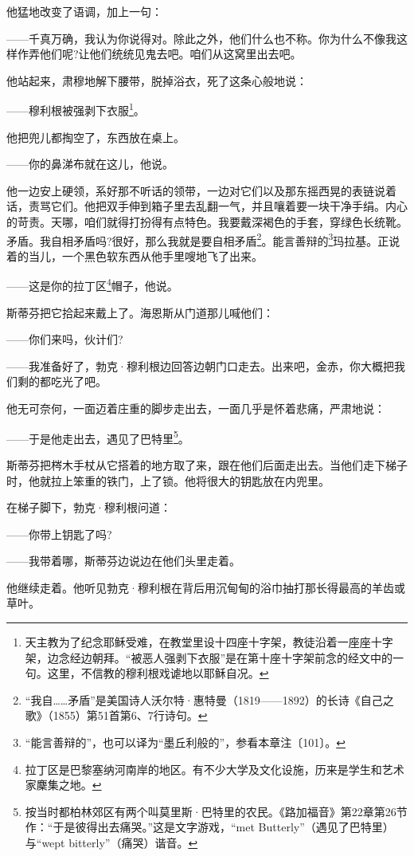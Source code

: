 \par 他猛地改变了语调，加上一句：
\par ——千真万确，我认为你说得对。除此之外，他们什么也不称。你为什么不像我这样作弄他们呢?让他们统统见鬼去吧。咱们从这窝里出去吧。
\par 他站起来，肃穆地解下腰带，脱掉浴衣，死了这条心般地说：
\par ——穆利根被强剥下衣服\footnote{天主教为了纪念耶稣受难，在教堂里设十四座十字架，教徒沿着一座座十字架，边念经边朝拜。“被恶人强剥下衣服”是在第十座十字架前念的经文中的一句。这里，不信教的穆利根戏谑地以耶稣自况。}。
\par 他把兜儿都掏空了，东西放在桌上。
\par ——你的鼻涕布就在这儿，他说。
\par 他一边安上硬领，系好那不听话的领带，一边对它们以及那东摇西晃的表链说着话，责骂它们。他把双手伸到箱子里去乱翻一气，并且嚷着要一块干净手绢。内心的苛责。天哪，咱们就得打扮得有点特色。我要戴深褐色的手套，穿绿色长统靴。矛盾。我自相矛盾吗?很好，那么我就是要自相矛盾\footnote{“我自……矛盾”是美国诗人沃尔特·惠特曼（1819——1892）的长诗《自己之歌》（1855）第51首第6、7行诗句。}。能言善辩的\footnote{“能言善辩的”，也可以译为“墨丘利般的”，参看本章注〔101〕。}玛拉基。正说着的当儿，一个黑色软东西从他手里嗖地飞了出来。
\par ——这是你的拉丁区\footnote{拉丁区是巴黎塞纳河南岸的地区。有不少大学及文化设施，历来是学生和艺术家麇集之地。}帽子，他说。
\par 斯蒂芬把它拾起来戴上了。海恩斯从门道那儿喊他们：
\par ——你们来吗，伙计们?
\par ——我准备好了，勃克·穆利根边回答边朝门口走去。出来吧，金赤，你大概把我们剩的都吃光了吧。
\par 他无可奈何，一面迈着庄重的脚步走出去，一面几乎是怀着悲痛，严肃地说：
\par ——于是他走出去，遇见了巴特里\footnote{按当时都柏林郊区有两个叫莫里斯·巴特里的农民。《路加福音》第22章第26节作：“于是彼得出去痛哭。”这是文字游戏，“met Butterly”（遇见了巴特里）与“wept bitterly”（痛哭）谐音。}。
\par 斯蒂芬把梣木手杖从它搭着的地方取了来，跟在他们后面走出去。当他们走下梯子时，他就拉上笨重的铁门，上了锁。他将很大的钥匙放在内兜里。
\par 在梯子脚下，勃克·穆利根问道：
\par ——你带上钥匙了吗?
\par ——我带着哪，斯蒂芬边说边在他们头里走着。
\par 他继续走着。他听见勃克·穆利根在背后用沉甸甸的浴巾抽打那长得最高的羊齿或草叶。
